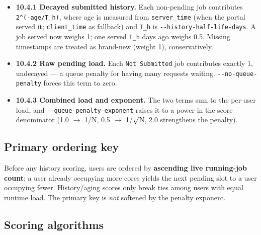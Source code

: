 \begin{itemize}
  \item \textbf{10.4.1 Decayed submitted history.} Each non-pending job contributes
  \texttt{2\textasciicircum{}(-\allowbreak{}age/\allowbreak{}T\_\allowbreak{}h)}, where age is measured from
  \texttt{server\_\allowbreak{}time} (when the portal served it; \texttt{client\_\allowbreak{}time} as
  fallback) and \texttt{T\_\allowbreak{}h} is
  \texttt{-\allowbreak{}-\allowbreak{}history-\allowbreak{}half-\allowbreak{}life-\allowbreak{}days}. A job
  served now weighs 1; one served \texttt{T\_\allowbreak{}h} days ago weighs 0.5. Missing timestamps are
  treated as brand-new (weight 1), conservatively.
  \item \textbf{10.4.2 Raw pending load.} Each \texttt{Not Submitted} job contributes exactly 1, undecayed ---
  a queue penalty for having many requests waiting.
  \texttt{-\allowbreak{}-\allowbreak{}no-\allowbreak{}queue-\allowbreak{}penalty} forces this term to zero.
  \item \textbf{10.4.3 Combined load and exponent.} The two terms sum to the per-user load, and
  \texttt{-\allowbreak{}-\allowbreak{}queue-\allowbreak{}penalty-\allowbreak{}exponent} raises it to a power in
  the score denominator (1.0 $\rightarrow$ 1/N, 0.5 $\rightarrow$ 1/$\surd$N, 2.0 strengthens the penalty).
\end{itemize}

\subsection{Primary ordering key}

Before any history scoring, users are ordered by \textbf{ascending live running-job count}: a user already
occupying more cores yields the next pending slot to a user occupying fewer. History/aging scores only break
ties among users with equal runtime load. The primary key is \textit{not} softened by the penalty exponent.

\subsection{Scoring algorithms}

